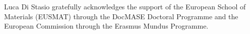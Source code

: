 \documentclass[Review,sagev,times]{sagej}
\begin{document}

\begin{acks}
Luca Di Stasio gratefully acknowledges the support of the European School of Materials (EUSMAT) through the DocMASE Doctoral Programme and the European Commission through the Erasmus Mundus Programme.
\end{acks}



\end{document}
